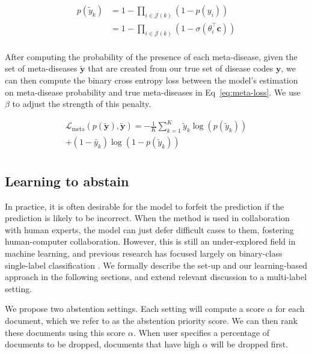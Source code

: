 \documentclass{article}[11pt,oneside]
\begin{document}
\begin{equation}
\begin{aligned}
p(\tilde{y}_k) &= 1 - \prod_{i \in \mathcal{J}(k)} (1 - p(y_i))  \\
&= 1 - \prod_{i \in \mathcal{J}(k)} (1 - \sigma(\theta_i^\intercal \bm{c})) \\
\end{aligned}
\label{eq:meta}
\end{equation}

After computing the probability of the presence of each meta-disease, given the set of meta-diseases $\bm{\tilde y}$ that are created from our true set of disease codes $\bm{y}$, we can then compute the binary cross entropy loss between the model's estimation on meta-disease probability and true meta-diseases in Eq~\ref{eq:meta-loss}. We use $\beta$ to adjust the strength of this penalty.

\begin{equation}
\begin{aligned}
\mathcal{L}_{\text{meta}}(p(\bm{\tilde{y}}), \bm{\tilde y}) = - \frac{1}{K} \sum_{k=1}^K \tilde{y}_k \log (p(\tilde{y}_k)) \\ +  (1 - \tilde{y_k})\log(1- p(\tilde{y}_k)) \\
\end{aligned}
\label{eq:meta-loss}
\end{equation}

\subsection{Learning to abstain}

In practice, it is often desirable for the model to forfeit the prediction if the prediction is likely to be incorrect. When the method is used in collaboration with human experts, the model can just defer difficult cases to them, fostering human-computer collaboration. However, this is still an under-explored field in machine learning, and previous research has focused largely on binary-class single-label classification \cite{cortes2016learning}.
We formally describe the set-up and our learning-based approach in the following sections, and extend relevant discussion to a multi-label setting.

We propose two abstention settings. Each setting will compute a score $\alpha$ for each document, which we refer to as the abstention priority score. We can then rank these documents using this score $\alpha$.
When user specifies a percentage of documents to be dropped, 
documents that have high $\alpha$ will be dropped first.
\end{document}
